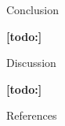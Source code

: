 \documentclass{matthijs}
\begin{document}
	\begin{hoofdstuk}{Conclusion}

		\textbf{[todo:]}

	\end{hoofdstuk}

	\begin{hoofdstuk}{Discussion}

		\textbf{[todo:]}

	\end{hoofdstuk}

	\begin{hoofdstuk}{References}

		\printbibliography[heading=none]
	
	\end{hoofdstuk}

	\clearpage
	\thispagestyle{empty}
	\addtocounter{page}{-1}
	\
	\clearpage
\end{document}
